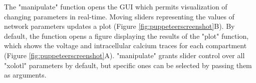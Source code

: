 \documentclass{frontiersSCNS} %
\newcommand{\eg}{\textit{e.g.}\xspace}
\begin{document}
The "manipulate" function opens the GUI which permits visualization of changing parameters in real-time. Moving sliders representing the values of network parameters updates a plot (Figure \ref{fig:puppeteerscreenshot}B). By default, the function opens a figure displaying the results of the "plot" function, which shows the voltage and intracellular calcium traces for each compartment (Figure \ref{fig:puppeteerscreenshot}A). "manipulate" grants slider control over all "xolotl" parameters by default, but specific ones can be selected by passing them as arguments.


%
%
%
%
%
%
\end{document}
